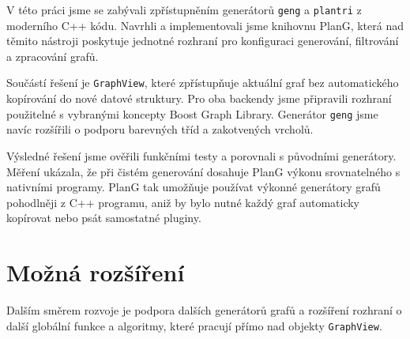 

V této práci jsme se zabývali zpřístupněním generátorů \texttt{geng} a
\texttt{plantri} z moderního C++ kódu. Navrhli a implementovali jsme knihovnu
PlanG, která nad těmito nástroji poskytuje jednotné rozhraní pro konfiguraci
generování, filtrování a zpracování grafů.

Součástí řešení je \texttt{GraphView}, které zpřístupňuje aktuální graf bez
automatického kopírování do nové datové struktury. Pro oba backendy jsme
připravili rozhraní použitelné s vybranými koncepty Boost Graph Library.
Generátor \texttt{geng} jsme navíc rozšířili o podporu barevných tříd a
zakotvených vrcholů.

Výsledné řešení jsme ověřili funkčními testy a porovnali s původními
generátory. Měření ukázala, že při čistém generování dosahuje PlanG výkonu
srovnatelného s nativními programy. PlanG tak umožňuje používat výkonné
generátory grafů pohodlněji z C++ programu, aniž by bylo nutné každý graf
automaticky kopírovat nebo psát samostatné pluginy.

\section*{Možná rozšíření}

Dalším směrem rozvoje je podpora dalších generátorů grafů a rozšíření rozhraní
o další globální funkce a algoritmy, které pracují přímo nad objekty
\texttt{GraphView}.
